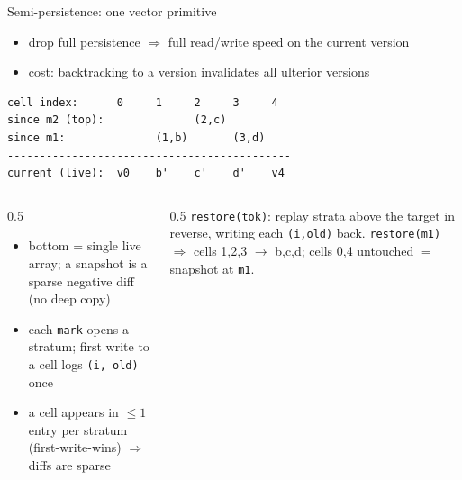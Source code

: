 \documentclass[aspectratio=169,10pt]{beamer}
\newcommand{\code}[1]{\texttt{\small #1}}
\begin{document}
\begin{frame}[fragile]{Semi-persistence: one vector primitive}
\begin{itemize}\small
  \item drop full persistence $\Rightarrow$ \alert{full read/write speed} on the current version
  \item cost: backtracking to a version \alert{invalidates all ulterior versions}
\end{itemize}
\vspace{-2mm}
\begin{lstlisting}[basicstyle=\ttfamily\normalsize]
cell index:      0     1     2     3     4
since m2 (top):              (2,c)
since m1:              (1,b)       (3,d)
--------------------------------------------
current (live):  v0    b'    c'    d'    v4
\end{lstlisting}
\vspace{-1mm}
\begin{columns}[T]
\begin{column}{0.5\textwidth}
\footnotesize
\begin{itemize}\footnotesize
  \item bottom = single live array; a snapshot is a \alert{sparse negative diff (no deep copy)}
  \item each \code{mark} opens a \alert{stratum}; first write to a cell logs \code{(i, old)} \alert{once}
  \item a cell appears in $\le 1$ entry per stratum (first-write-wins) $\Rightarrow$ diffs are \alert{sparse}
\end{itemize}
\end{column}
\begin{column}{0.5\textwidth}
\footnotesize
\code{restore(tok)}: replay strata above the target \alert{in reverse}, writing each \code{(i,old)} back.
\smallskip
\code{restore(m1)} $\Rightarrow$ cells 1,2,3 $\to$ b,c,d; cells 0,4 untouched $=$ snapshot at \code{m1}.
\end{column}
\end{columns}
\end{frame}
\end{document}
